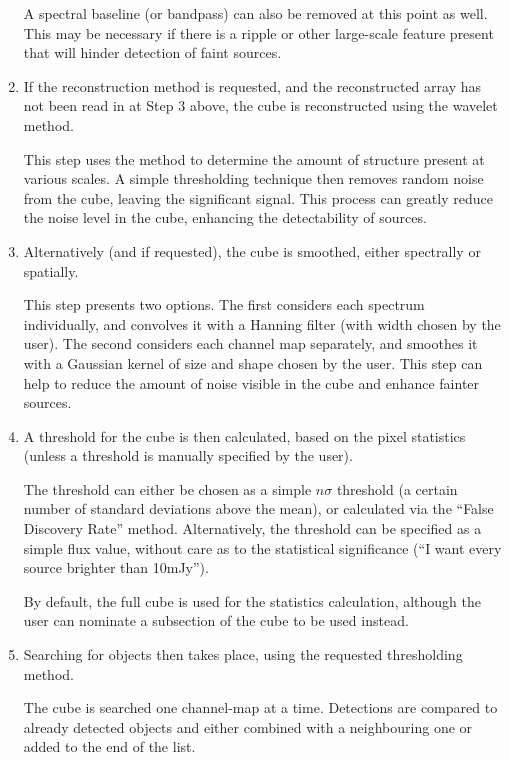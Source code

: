 \begin{enumerate}
  A spectral baseline (or bandpass) can also be removed at this point
  as well. This may be necessary if there is a ripple or other
  large-scale feature present that will hinder detection of faint
  sources.

\item If the reconstruction method is requested, and the reconstructed
  array has not been read in at Step 3 above, the cube is
  reconstructed using the \atrous wavelet method.

  This step uses the \atrous method to determine the amount of
  structure present at various scales. A simple thresholding technique
  then removes random noise from the cube, leaving the significant
  signal. This process can greatly reduce the noise level in the cube,
  enhancing the detectability of sources.

\item Alternatively (and if requested), the cube is smoothed, either
  spectrally or spatially.

  This step presents two options. The first considers each spectrum
  individually, and convolves it with a Hanning filter (with width
  chosen by the user). The second considers each channel map
  separately, and smoothes it with a Gaussian kernel of size and shape
  chosen by the user. This step can help to reduce the amount of noise
  visible in the cube and enhance fainter sources.

\item A threshold for the cube is then calculated, based on the pixel
  statistics (unless a threshold is manually specified by the user).

  The threshold can either be chosen as a simple $n\sigma$ threshold
  (\ie a certain number of standard deviations above the mean), or
  calculated via the ``False Discovery Rate'' method. Alternatively,
  the threshold can be specified as a simple flux value, without care
  as to the statistical significance (\eg ``I want every source
  brighter than 10mJy'').

  By default, the full cube is used for the statistics calculation,
  although the user can nominate a subsection of the cube to be used
  instead. 

\item Searching for objects then takes place, using the requested
  thresholding method.

  The cube is searched one channel-map at a time. Detections are
  compared to already detected objects and either combined with a
  neighbouring one or added to the end of the list.


\end{enumerate}
